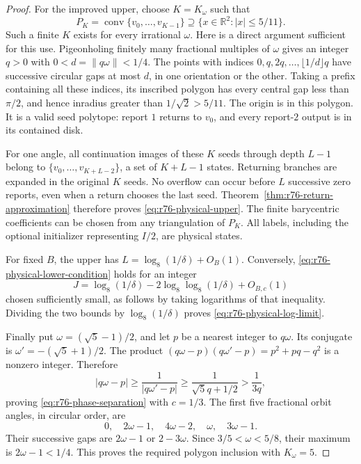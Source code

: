 \begin{proof}
For the improved upper, choose $K=K_\omega$ such that
\[
 P_K=\operatorname{conv}\{v_0,\ldots,v_{K-1}\}
 \supseteq\{x\in\mathbb R^2:|x|\le5/11\}.
\]
Such a finite $K$ exists for every irrational $\omega$.  Here is a direct
argument sufficient for this use.  Pigeonholing finitely many fractional
multiples of $\omega$ gives an integer $q>0$ with
$0<d=\|q\omega\|<1/4$.  The points with indices
$0,q,2q,\ldots,\lfloor1/d\rfloor q$ have successive circular gaps at
most $d$, in one orientation or the other.  Taking a prefix containing
all these indices, its inscribed polygon has every central gap less
than $\pi/2$, and hence inradius greater than $1/\sqrt2>5/11$.
The origin is in this polygon.  It is a valid seed polytope: report $1$
returns to $v_0$, and every report-$2$ output is in its contained disk.

For one angle, all continuation images of these $K$ seeds through depth
$L-1$ belong to
$\{v_0,\ldots,v_{K+L-2}\}$, a set of $K+L-1$ states.  Returning
branches are expanded in the original $K$ seeds.  No overflow can occur
before $L$ successive zero reports, even when a return chooses the last
seed.  Theorem~\ref{thm:r76-return-approximation} therefore proves
\eqref{eq:r76-physical-upper}.  The finite barycentric coefficients can
be chosen from any triangulation of $P_K$.  All labels, including the
optional initializer representing $I/2$, are physical states.

For fixed $B$, the upper has
$L=\log_8(1/\delta)+O_B(1)$.  Conversely,
\eqref{eq:r76-physical-lower-condition} holds for an integer
\[
 J=\log_8(1/\delta)
       -2\log_8\log_8(1/\delta)+O_{B,c}(1)
\]
chosen sufficiently small, as follows by taking logarithms of that
inequality.  Dividing the two bounds by $\log_8(1/\delta)$ proves
\eqref{eq:r76-physical-log-limit}.

Finally put $\omega=(\sqrt5-1)/2$, and let $p$ be a nearest integer to
$q\omega$.  Its conjugate is $\omega'=-(\sqrt5+1)/2$.  The product
$(q\omega-p)(q\omega'-p)=p^2+pq-q^2$ is a nonzero integer.  Therefore
\[
 |q\omega-p|\ge\frac1{|q\omega'-p|}
 \ge\frac1{\sqrt5q+1/2}>\frac1{3q},
\]
proving \eqref{eq:r76-phase-separation} with $c=1/3$.
The first five fractional orbit angles, in circular order, are
\[
 0,\quad 2\omega-1,\quad4\omega-2,\quad\omega,\quad3\omega-1.
\]
Their successive gaps are $2\omega-1$ or $2-3\omega$.
Since $3/5<\omega<5/8$, their maximum is $2\omega-1<1/4$.
This proves the required polygon inclusion with $K_\omega=5$.
\end{proof}

